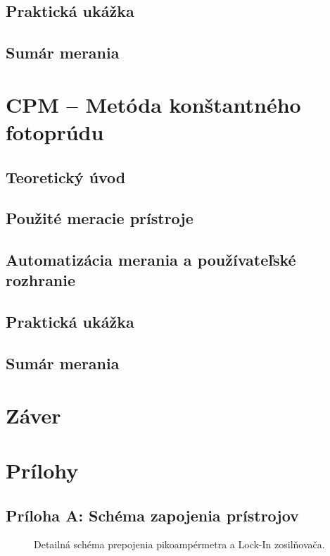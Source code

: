 \documentclass[12pt,a4paper]{article}
\begin{document}
\subsection{Praktická ukážka}
\subsection{Sumár merania}

\newpage
\section{CPM -- Metóda konštantného fotoprúdu}
\subsection{Teoretický úvod}
\subsection{Použité meracie prístroje}
\subsection{Automatizácia merania a používateľské rozhranie}
\subsection{Praktická ukážka}
\subsection{Sumár merania}


\newpage
\section{Záver}

\newpage
\printbibliography[title={Zoznam použitej literatúry}]

\newpage
\section*{Prílohy}

\subsection*{Príloha A: Schéma zapojenia prístrojov}
\begin{figure}[htbp]
    \centering
    \caption{Detailná schéma prepojenia pikoampérmetra a Lock-In zosilňovača.}
    \label{fig:schema_zapojenia}
\end{figure}
\end{document}
